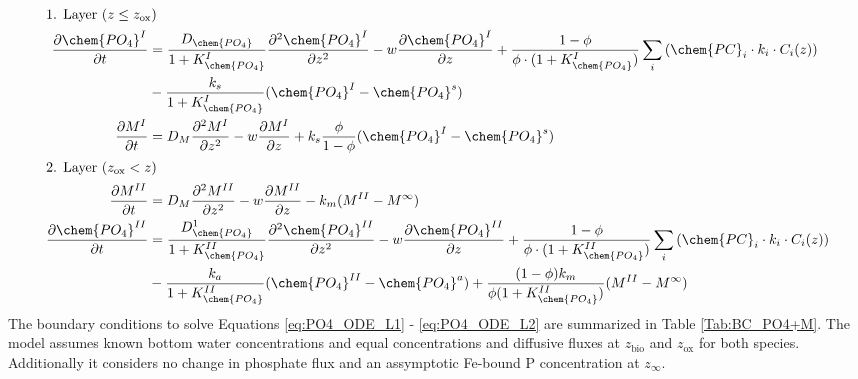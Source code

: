 \documentclass[gmd, manuscript]{copernicus}
\begin{document}
\begin{align}
\intertext{1. Layer ($z \leq z_{\mathrm{ox}}$)}
 \frac{\partial \chem{PO_4}^I}{\partial t} &= \frac{D_{\chem{PO_4}}}{1+K_{\chem{PO_4}}^I} \frac{\partial^2\chem{PO_4}^I }{\partial z^2} - w\frac{\partial \chem{PO_4}^I }{\partial z} + \frac{1-\phi}{\phi \cdot (1+K_{\chem{PO_4}}^I)}\sum_i 
					\left( \chem{PC}_i \cdot k_i \cdot C_{i}(z) \right) \notag\\
					& - \frac{k_{s}}{1+K_{\chem{PO_4}}^I}(\chem{PO_4}^I-\chem{PO_4}^s)\label{eq:PO4_ODE_L1}\\  %
 \frac{\partial M^I}{\partial t} &= D_{M}\frac{\partial^2M^I }{\partial z^2} - w\frac{\partial M^I }{\partial z} + k_{s}\frac{\phi}{1-\phi}(\chem{PO_4}^I-\chem{PO_4}^s)\label{eq:M_ODE_L1}\\  
 \intertext{2. Layer ($z_{\mathrm{ox}} < z$)} 
 \frac{\partial M^{II}}{\partial t} & = D_{M}\frac{\partial^2M^{II} }{\partial z^2} - w\frac{\partial M^{II} }{\partial z} - k_{m}(M^{II} - M^\infty)\label{eq:M_ODE_L2}\\  
 \frac{\partial \chem{PO_4}^{II}}{\partial t} &= \frac{D_{\chem{PO_4}}^1}{1+K_{\chem{PO_4}}^{II}} \frac{\partial^2\chem{PO_4}^{II} }{\partial z^2} - w\frac{\partial \chem{PO_4}^{II} }{\partial z} + \frac{1-\phi}{\phi \cdot (1+K_{\chem{PO_4}}^{II})}\sum_i 
					\left( \chem{PC}_i \cdot k_i \cdot C_{i}(z) \right) \notag\\
					& - \frac{k_{a}}{1+K_{\chem{PO_4}}^{II}}(\chem{PO_4}^{II}-\chem{PO_4}^a) + \frac{(1-\phi)k_{m}}{\phi(1+K_{\chem{PO_4}}^{II})}(M^{II}-M^\infty)\label{eq:PO4_ODE_L2}\\
\end{align}
The boundary conditions to solve Equations \ref{eq:PO4_ODE_L1} - \ref{eq:PO4_ODE_L2} are summarized in Table \ref{Tab:BC_PO4+M}. 
The model assumes known bottom water concentrations and equal concentrations and diffusive fluxes at $z_{\mathrm{bio}}$ and $z_{\mathrm{ox}}$ for both species. Additionally it considers no change in phosphate flux and an assymptotic Fe-bound P 
concentration at $z_\infty$. 
\end{document}
